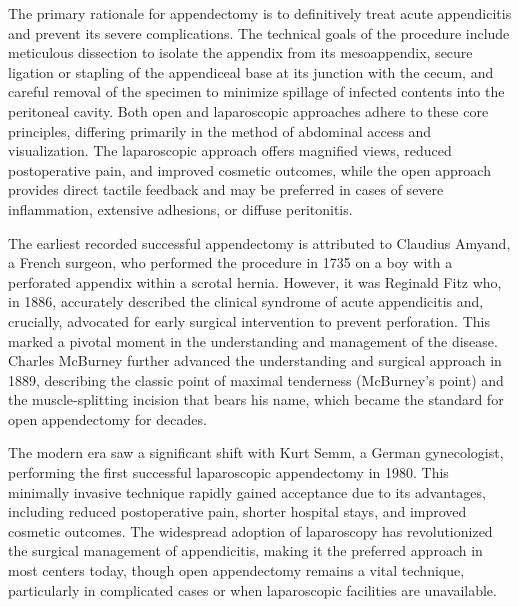 The primary rationale for appendectomy is to definitively treat acute appendicitis and prevent its severe complications. The technical goals of the procedure include meticulous dissection to isolate the appendix from its mesoappendix, secure ligation or stapling of the appendiceal base at its junction with the cecum, and careful removal of the specimen to minimize spillage of infected contents into the peritoneal cavity. Both open and laparoscopic approaches adhere to these core principles, differing primarily in the method of abdominal access and visualization. The laparoscopic approach offers magnified views, reduced postoperative pain, and improved cosmetic outcomes, while the open approach provides direct tactile feedback and may be preferred in cases of severe inflammation, extensive adhesions, or diffuse peritonitis.

The earliest recorded successful appendectomy is attributed to Claudius Amyand, a French surgeon, who performed the procedure in 1735 on a boy with a perforated appendix within a scrotal hernia. However, it was Reginald Fitz who, in 1886, accurately described the clinical syndrome of acute appendicitis and, crucially, advocated for early surgical intervention to prevent perforation. This marked a pivotal moment in the understanding and management of the disease. Charles McBurney further advanced the understanding and surgical approach in 1889, describing the classic point of maximal tenderness (McBurney's point) and the muscle-splitting incision that bears his name, which became the standard for open appendectomy for decades.

The modern era saw a significant shift with Kurt Semm, a German gynecologist, performing the first successful laparoscopic appendectomy in 1980. This minimally invasive technique rapidly gained acceptance due to its advantages, including reduced postoperative pain, shorter hospital stays, and improved cosmetic outcomes. The widespread adoption of laparoscopy has revolutionized the surgical management of appendicitis, making it the preferred approach in most centers today, though open appendectomy remains a vital technique, particularly in complicated cases or when laparoscopic facilities are unavailable.

